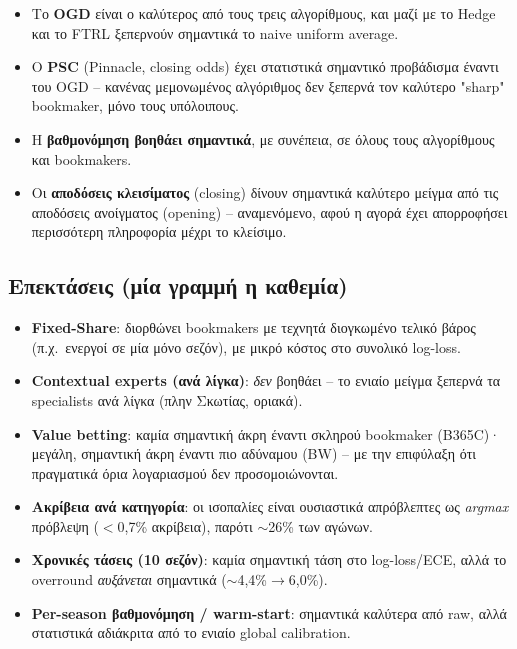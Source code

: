 \documentclass[11pt,a4paper]{article}
\renewcommand{\_}{\oldunderscore\allowbreak}
\begin{document}
\begin{itemize}
  \item Το \textbf{OGD} είναι ο καλύτερος από τους τρεις αλγορίθμους, και μαζί με το Hedge
        και το FTRL ξεπερνούν σημαντικά το naive uniform average.
  \item Ο \textbf{PSC} (Pinnacle, closing odds) έχει στατιστικά σημαντικό προβάδισμα έναντι
        του OGD -- κανένας μεμονωμένος αλγόριθμος δεν ξεπερνά τον καλύτερο "sharp"
        bookmaker, μόνο τους υπόλοιπους.
  \item Η \textbf{βαθμονόμηση βοηθάει σημαντικά}, με συνέπεια, σε όλους τους αλγορίθμους
        και bookmakers.
  \item Οι \textbf{αποδόσεις κλεισίματος} (closing) δίνουν σημαντικά καλύτερο μείγμα από
        τις αποδόσεις ανοίγματος (opening) -- αναμενόμενο, αφού η αγορά έχει απορροφήσει
        περισσότερη πληροφορία μέχρι το κλείσιμο.
\end{itemize}

\subsection{Επεκτάσεις (μία γραμμή η καθεμία)}

\begin{itemize}
  \item \textbf{Fixed-Share}: διορθώνει bookmakers με τεχνητά διογκωμένο τελικό βάρος
        (π.χ.\ ενεργοί σε μία μόνο σεζόν), με μικρό κόστος στο συνολικό log-loss.
  \item \textbf{Contextual experts (ανά λίγκα)}: \emph{δεν} βοηθάει -- το ενιαίο μείγμα
        ξεπερνά τα specialists ανά λίγκα (πλην Σκωτίας, οριακά).
  \item \textbf{Value betting}: καμία σημαντική άκρη έναντι σκληρού bookmaker (B365C)·
        μεγάλη, σημαντική άκρη έναντι πιο αδύναμου (BW) -- με την επιφύλαξη ότι
        πραγματικά όρια λογαριασμού δεν προσομοιώνονται.
  \item \textbf{Ακρίβεια ανά κατηγορία}: οι ισοπαλίες είναι ουσιαστικά απρόβλεπτες ως
        \emph{argmax} πρόβλεψη ($<$0,7\% ακρίβεια), παρότι $\sim$26\% των αγώνων.
  \item \textbf{Χρονικές τάσεις (10 σεζόν)}: καμία σημαντική τάση στο log-loss/ECE, αλλά
        το overround \emph{αυξάνεται} σημαντικά ($\sim$4,4\%$\to$6,0\%).
  \item \textbf{Per-season βαθμονόμηση / warm-start}: σημαντικά καλύτερα από raw, αλλά
        στατιστικά αδιάκριτα από το ενιαίο global calibration.
\end{itemize}
\end{document}
